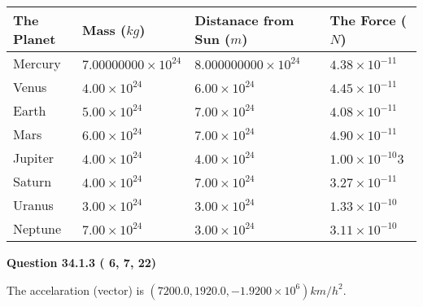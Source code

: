 \documentclass[12pt]{article}
\begin{document}
 
\begin{tabular}{|l|l|l|l|}
\hline
The Planet & Mass ($kg$) & Distanace from Sun ($m$) & The Force ($N$)\\
\hline
Mercury  &
           $ %
7.00000000 \times 10^{24}  $   &
             $ %
8.000000000 \times 10^{24}$    & $ %
4.38 \times 10^{-11} $
\\  \hline
Venus    &
           $  %
4.00 \times 10^{24}  $     &
             $ %
6.00 \times 10^{24} $    & $ %
4.45 \times 10^{-11} $
\\  \hline
Earth    &
           $  %
5.00 \times 10^{24}$     &
             $ %
7.00 \times 10^{24} $    & $ %
4.08 \times 10^{-11} $
\\   \hline
Mars     &
           $  %
6.00 \times 10^{24} $     &
             $ %
7.00 \times 10^{24}$    & $ %
4.90 \times 10^{-11} $
\\   \hline
Jupiter  &
           $  %
4.00 \times 10^{24}  $    &
             $ %
4.00 \times 10^{24} $    & $ %
1.00 \times 10^{-10}3 $
\\  \hline
Saturn   &
           $  %
4.00 \times 10^{24}   $    &
             $ %
7.00 \times 10^{24}  $    & $ %
3.27 \times 10^{-11} $
\\  \hline
Uranus   &
           $  %
3.00 \times 10^{24} $    &
             $ %
3.00 \times 10^{24}$    & $ %
1.33 \times 10^{-10} $
\\  \hline
Neptune  &
           $  %
7.00 \times 10^{24}  $    &
             $ %
3.00 \times 10^{24} $    & $ %
3.11 \times 10^{-10} $
\\  \hline
 
\end{tabular}
 
 
 
 
  
\vspace{0.2in}
  
{\textbf{\Large{Question
34.1.3 
 (          6,          7,         22)
}}}
  
  
 
 
\noindent{}
 
 
The accelaration (vector) is
$(
7200.0,
1920.0 ,
-1.9200 \times 10^{6}
)km/h^2.
$
 
 
 
 
 
 
\noindent{}
\end{document}
